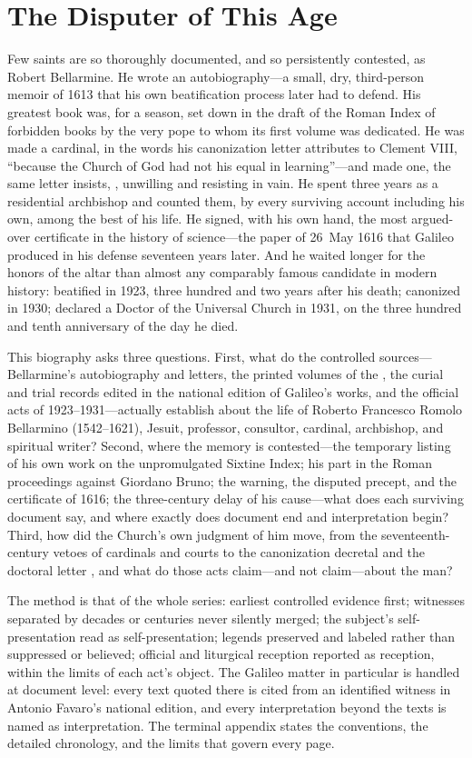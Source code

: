 \section{The Disputer of This Age}

Few saints are so thoroughly documented, and so persistently contested,
as Robert Bellarmine. He wrote an autobiography---a small, dry,
third-person memoir of 1613 that his own beatification process later
had to defend. His greatest book was, for a season, set down in the
draft of the Roman Index of forbidden books by the very pope to whom
its first volume was dedicated. He was made a cardinal, in the words
his canonization letter attributes to Clement VIII, ``because the
Church of God had not his equal in learning''---and made one, the same
letter insists, , unwilling and
resisting in vain. He spent three years as a residential archbishop
and counted them, by every surviving account including his own, among
the best of his life. He signed, with his own hand, the most argued-over
certificate in the history of science---the paper of 26~May 1616 that
Galileo produced in his defense seventeen years later. And he waited
longer for the honors of the altar than almost any comparably famous
candidate in modern history: beatified in 1923, three hundred and two
years after his death; canonized in 1930; declared a Doctor of the
Universal Church in 1931, on the three hundred and tenth anniversary
of the day he died.

This biography asks three questions. First, what do the controlled
sources---Bellarmine's autobiography and letters, the printed volumes
of the , the curial and trial
records edited in the national edition of Galileo's works, and the
official acts of 1923--1931---actually establish about the life of
Roberto Francesco Romolo Bellarmino (1542--1621), Jesuit, professor,
consultor, cardinal, archbishop, and spiritual writer? Second, where
the memory is contested---the temporary listing of his own work on
the unpromulgated Sixtine Index; his part in the Roman proceedings
against Giordano Bruno; the warning, the disputed precept, and the
certificate of 1616; the three-century delay of his cause---what does
each surviving document say, and where exactly does document end and
interpretation begin? Third, how did the Church's own judgment of him
move, from the seventeenth-century vetoes of cardinals and courts to
the canonization decretal  and the doctoral letter
, and what do those acts claim---and not
claim---about the man?

The method is that of the whole series: earliest controlled evidence
first; witnesses separated by decades or centuries never silently
merged; the subject's self-presentation read as self-presentation;
legends preserved and labeled rather than suppressed or believed;
official and liturgical reception reported as reception, within the
limits of each act's object. The Galileo matter in particular is
handled at document level: every text quoted there is cited from an
identified witness in Antonio Favaro's national edition, and every
interpretation beyond the texts is named as interpretation. The
terminal appendix states the conventions, the detailed chronology,
and the limits that govern every page.
